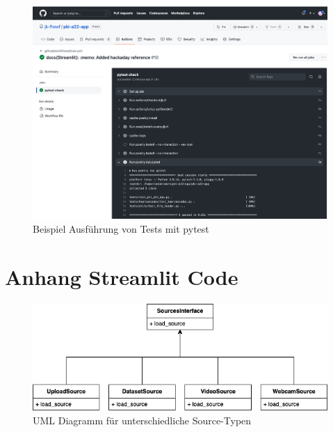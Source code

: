 \documentclass{article}
\begin{document}
\begin{figure}[H]
	\begin{center}
 	\includegraphics[scale=0.25]{../images/ci_actions.png}
 	\caption{Beispiel Ausführung von Tests mit pytest}
	\end{center}
\end{figure}

\section{Anhang Streamlit Code}




\newpage
\begin{figure}
	\centering
	\includegraphics[scale=0.5]{input_sources.png}
	\caption{UML Diagramm für unterschiedliche Source-Typen}
\end{figure}






\end{document}
